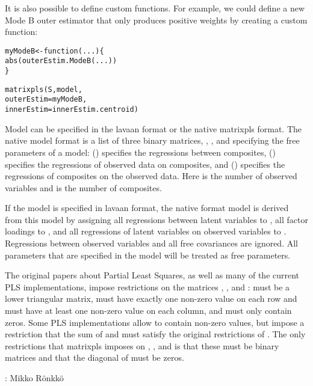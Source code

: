 \documentclass[a4paper]{book}
\begin{document}
\begin{Details}
It is also possible to define custom functions. For example, we could define a new Mode B outer
estimator that only produces positive weights by creating a custom function:

\begin{alltt}
myModeB <- function(...)\{
  abs(outerEstim.ModeB(...))
\}

matrixpls(S, model,
          outerEstim = myModeB,
          innerEstim = innerEstim.centroid)
\end{alltt}


Model can be specified in the lavaan format or the native matrixpls format.
The native model format is a list of three binary matrices, , ,
and  specifying the free parameters of a model:  () specifies the 
regressions between composites,  () specifies the regressions of observed
data on composites, and  () specifies the regressions of composites on the
observed data. Here  is the number of observed variables and  is the number of composites.

If the model is specified in lavaan format, the native
format model is derived from this model by assigning all regressions between latent
variables to , all factor loadings to , and all regressions
of latent variables on observed variables to . Regressions between
observed variables and all free covariances are ignored. All parameters that are
specified in the model will be treated as free parameters.

The original papers about Partial Least Squares, as well as many of the current PLS
implementations, impose restrictions on the matrices ,
, and :  must be a lower triangular matrix,
 must have exactly one non-zero value on each row and must have at least
one non-zero value on each column, and  must only contain zeros.
Some PLS implementations allow  to contain non-zero values, but impose a
restriction that the sum of  and  must satisfy
the original restrictions of . The only restrictions that matrixpls
imposes on , , and  is that these must be
binary matrices and that the diagonal of  must be zeros.
\end{Details}
%
\begin{Author}\relax
{}: Mikko Rönkkö 

\end{Author}
\end{document}
